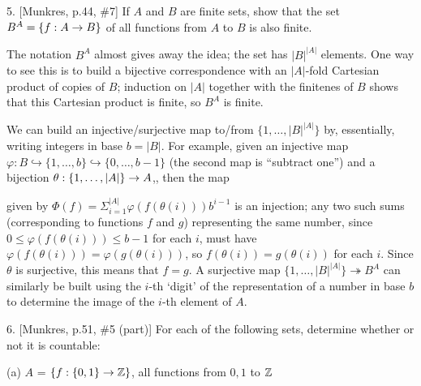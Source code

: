 \msk


\item{5.} [Munkres, p.44, \#7] If $A$ and $B$ are finite sets, show that the
set $B^A = \{f:A\rightarrow B\}$ of all functions from $A$ to $B$ is also finite.

\msk


The notation $B^A$ almost gives away the idea; the set has $|B|^{|A|}$ elements. 
One way to see this is to build a bijective correspondence with an $|A|$-fold 
Cartesian product of copies of $B$; induction on $|A|$ together with the
finitenes of $B$ shows that this Cartesian product is finite, so $B^A$ is finite.

We can build an injective/surjective map to/from $\{1,\ldots,|B|^{|A|}\}$ by,
essentially, writing integers in base $b=|B|$. For example, given an
injective map $\varphi:B\hookrightarrow\{1,\ldots,b\}\hookrightarrow\{0,\ldots,b-1\}$
(the second map is ``subtract one'') and a bijection $\theta:\{1,\ldots,|A|\}\rightarrow A$,, then the map

\ssk


\ssk

\nidt given by $\displaystyle \Phi(f) = \Sigma_{i=1}^{|A|} \varphi(f(\theta(i)))b^{i-1}$ is an injection; 
any two such sums (corresponding to functions $f$ and $g$)
representing the same number, since $0\leq\varphi(f(\theta(i)))\leq b-1$ for each $i$,
must have $\varphi(f(\theta(i)))=\varphi(g(\theta(i)))$, so $f(\theta(i))=g(\theta(i))$ for each $i$.
Since $\theta$ is surjective, this means that $f=g$. A surjective map
$\{1,\ldots,|B|^{|A|}\}\twoheadrightarrow B^A$ can similarly be built using the $i$-th `digit' of the
representation of a number in base $b$ to determine the image of the $i$-th element of $A$.

\ssk

\item{6.} [Munkres, p.51, \#5 (part)] For each of the following sets, determine
whether or not it is countable:

\ssk

\item{} (a) $A$ = $\{f:\{0,1\}\rightarrow {\Bbb Z}\}$, all functions from ${0,1}$ to $\Bbb Z$

\ssk

